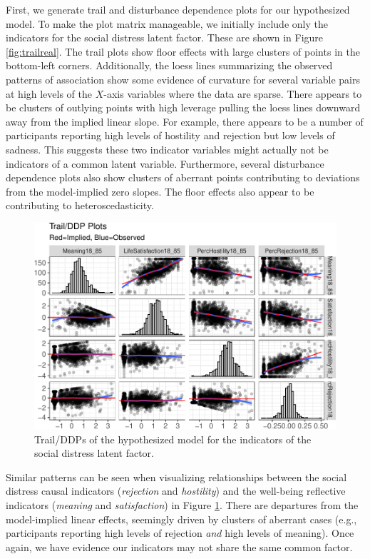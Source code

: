 \documentclass[
  english,
  man]{apa6}
\begin{document}
First, we generate trail and disturbance dependence plots for our hypothesized model. To make the plot matrix manageable, we initially include only the indicators for the social distress latent factor. These are shown in Figure \ref{fig:trailreal}. The trail plots show floor effects with large clusters of points in the bottom-left corners. Additionally, the loess lines summarizing the observed patterns of association show some evidence of curvature for several variable pairs at high levels of the \(X\)-axis variables where the data are sparse. There appears to be clusters of outlying points with high leverage pulling the loess lines downward away from the implied linear slope. For example, there appears to be a number of participants reporting high levels of hostility and rejection but low levels of sadness. This suggests these two indicator variables might actually not be indicators of a common latent variable. Furthermore, several disturbance dependence plots also show clusters of aberrant points contributing to deviations from the model-implied zero slopes. The floor effects also appear to be contributing to heteroscedasticity.

\begin{figure}

{\centering \includegraphics[width=0.9\linewidth]{flexplavaan_draft_files/figure-latex/trailreal2-1} 

}

\caption{Trail/DDPs of the hypothesized model for the indicators of the social distress latent factor.}\label{fig:trailreal2}
\end{figure}

Similar patterns can be seen when visualizing relationships between the social distress causal indicators (\emph{rejection} and \emph{hostility}) and the well-being reflective indicators (\emph{meaning} and \emph{satisfaction}) in Figure \ref{fig:trailreal2}. There are departures from the model-implied linear effects, seemingly driven by clusters of aberrant cases (e.g., participants reporting high levels of rejection \emph{and} high levels of meaning). Once again, we have evidence our indicators may not share the same common factor.
\end{document}
